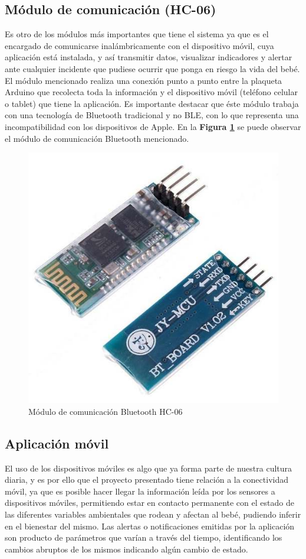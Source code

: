 \documentclass{IEEEtran}
\begin{document}
		\subsection{Módulo de comunicación (\textbf{HC-06})}

			Es otro de los módulos más importantes que tiene el sistema ya que es el encargado de comunicarse inalámbricamente con el dispositivo móvil, cuya aplicación está instalada, y así transmitir datos, visualizar indicadores y alertar ante cualquier incidente que pudiese ocurrir que ponga en riesgo la vida del bebé. El módulo mencionado realiza una conexión punto a punto entre la plaqueta Arduino que recolecta toda la información y el dispositivo móvil (teléfono celular o tablet) que tiene la aplicación. Es importante destacar que éste módulo trabaja con una tecnología de Bluetooth tradicional y no BLE, con lo que representa una incompatibilidad con los dispositivos de Apple. En la \textbf{Figura \ref{arduino-modulo-bluetooth}} se puede observar el módulo de comunicación Bluetooth mencionado.

			\begin{figure}
				\centering
				\includegraphics[width=0.5\linewidth]{arduino-modulo-bluetooth}
				\caption{Módulo de comunicación Bluetooth HC-06}
				\label{arduino-modulo-bluetooth}
			\end{figure}

		\subsection{Aplicación móvil}
		
			El uso de los dispositivos móviles es algo que ya forma parte de nuestra cultura diaria, y es por ello que el proyecto presentado tiene relación a la conectividad móvil, ya que es posible hacer llegar la información leída por los sensores a dispositivos móviles, permitiendo estar en contacto permanente con el estado de las diferentes variables ambientales que rodean y afectan al bebé, pudiendo inferir en el bienestar del mismo. Las alertas o notificaciones emitidas por la aplicación son producto de parámetros que varían a través del tiempo, identificando los cambios abruptos de los mismos indicando algún cambio de estado. 
			
\end{document}
